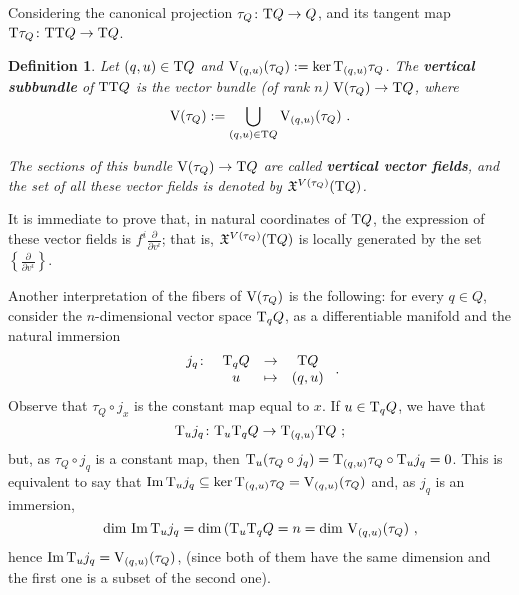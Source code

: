 \documentclass[12pt]{report}
\newtheorem{definition}[teor]{Definition}
\def\dst{\displaystyle}
\def\derpar#1#2{\frac{\partial{#1}}{\partial{#2}}}
\def\vf{\mathfrak X}
\def\Tan{{\rm T}}
\begin{document}
Considering the canonical projection $\tau_Q \colon \Tan Q \to Q$,
and its tangent map $\Tan\tau_Q\colon\Tan\Tan Q\to\Tan Q$.

\begin{definition}
Let $(q,u)\in\Tan Q$ and ${\rm V}_{(q,u)}(\tau_Q):=\ker \Tan_{(q,u)}\tau_Q$.
The \textbf{vertical subbundle} of $\Tan\Tan Q$ is the vector bundle (of rank $n$)
${\rm V}(\tau_Q)\to\Tan Q$, where
$$
{\rm V}(\tau_Q) := \bigcup_{(q,u)\in\Tan Q}{\rm V}_{(q,u)}(\tau_Q) \ .
$$

The sections of this bundle ${\rm V}(\tau_Q)\to\Tan Q$ are called \textbf{vertical vector fields},
and the set of all these vector fields is denoted by
$\vf^{V(\tau_Q)}(\Tan Q)$.
\end{definition}

It is immediate to prove that, in natural coordinates of $\Tan Q$,
the expression of these vector fields is
\(\dst f^i\derpar{}{v^i}\); that is, $\vf^{V(\tau_Q)}(\Tan Q)$
is locally generated by the set \(\dst\left\{\derpar{}{v^i}\right\}\).

Another interpretation of the fibers of ${\rm V}(\tau_Q)$ is the following:
for every $q\in Q$, consider the $n$-dimensional vector space $\Tan_qQ$,
as a differentiable manifold and the natural immersion
$$
\begin{array}{cccc}
j_q \colon & \Tan_qQ & \to & \Tan Q
\\
& u & \mapsto & (q,u)
\end{array} \ .
$$
Observe that $\tau_Q\circ j_x$ is the constant map equal to $x$. 
If $u \in \Tan_qQ$, we have that
$$
\Tan_uj_q \colon  \Tan_u\Tan_qQ \to \Tan_{(q,u)}\Tan Q \ ;
$$
but, as $\tau_Q\circ j_q$ is a constant map,
then $\Tan_u(\tau_Q\circ j_q)=\Tan_{(q,u)}\tau_Q\circ\Tan_uj_q=0$.
This is equivalent to say that
${\rm Im}\,\Tan_uj_q\subseteq\ker \Tan_{(q,u)}\tau_Q={\rm V}_{(q,u)}(\tau_Q)$
and, as $j_q$ is an immersion,
$$
\dim\,{\rm Im}\,\Tan_uj_q=\dim\,(\Tan_u\Tan_qQ=n=\dim\,{\rm V}_{(q,u)}(\tau_Q) \ ,
$$
hence ${\rm Im}\,\Tan_uj_q={\rm V}_{(q,u)}(\tau_Q)$,
(since both of them have the same dimension and the first one is a subset of the second one).
\end{document}
